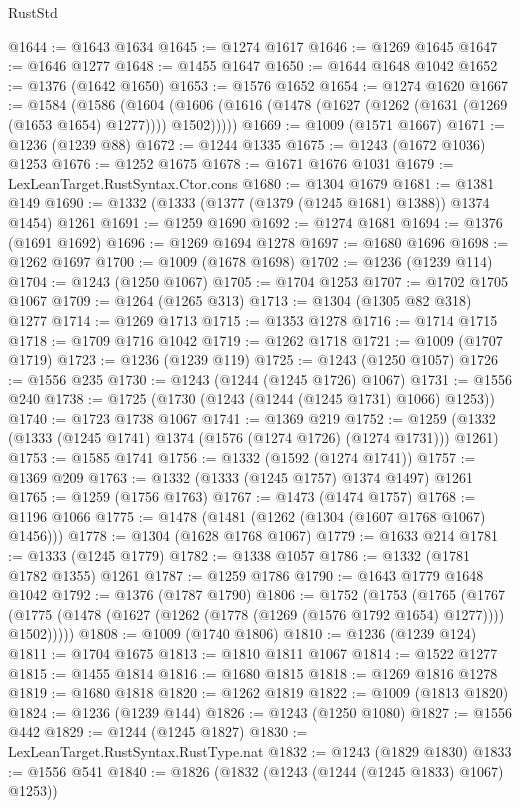 \begin{lexlean}{RustStd}
\begin{coremodule}
{\begin{coremodule}
{{{{{{{{{{{{{{{{{{{{{{{{{{{{{{{{{{{@1644 := @1643 @1634
@1645 := @1274 @1617
@1646 := @1269 @1645
@1647 := @1646 @1277
@1648 := @1455 @1647
@1650 := @1644 @1648 @1042
@1652 := @1376 (@1642 @1650)
@1653 := @1576 @1652
@1654 := @1274 @1620
@1667 := @1584
    (@1586
      (@1604 (@1606 (@1616 (@1478 (@1627 (@1262 (@1631 (@1269 (@1653 @1654) @1277)))) @1502)))))
@1669 := @1009 (@1571 @1667)
@1671 := @1236 (@1239 @88)
@1672 := @1244 @1335
@1675 := @1243 (@1672 @1036) @1253
@1676 := @1252 @1675
@1678 := @1671 @1676 @1031
@1679 := LexLeanTarget.RustSyntax.Ctor.cons
@1680 := @1304 @1679
@1681 := @1381 @149
@1690 := @1332 (@1333 (@1377 (@1379 (@1245 @1681) @1388)) @1374 @1454) @1261
@1691 := @1259 @1690
@1692 := @1274 @1681
@1694 := @1376 (@1691 @1692)
@1696 := @1269 @1694 @1278
@1697 := @1680 @1696
@1698 := @1262 @1697
@1700 := @1009 (@1678 @1698)
@1702 := @1236 (@1239 @114)
@1704 := @1243 (@1250 @1067)
@1705 := @1704 @1253
@1707 := @1702 @1705 @1067
@1709 := @1264 (@1265 @313)
@1713 := @1304 (@1305 @82 @318) @1277
@1714 := @1269 @1713
@1715 := @1353 @1278
@1716 := @1714 @1715
@1718 := @1709 @1716 @1042
@1719 := @1262 @1718
@1721 := @1009 (@1707 @1719)
@1723 := @1236 (@1239 @119)
@1725 := @1243 (@1250 @1057)
@1726 := @1556 @235
@1730 := @1243 (@1244 (@1245 @1726) @1067)
@1731 := @1556 @240
@1738 := @1725 (@1730 (@1243 (@1244 (@1245 @1731) @1066) @1253))
@1740 := @1723 @1738 @1067
@1741 := @1369 @219
@1752 := @1259 (@1332 (@1333 (@1245 @1741) @1374 (@1576 (@1274 @1726) (@1274 @1731))) @1261)
@1753 := @1585 @1741
@1756 := @1332 (@1592 (@1274 @1741))
@1757 := @1369 @209
@1763 := @1332 (@1333 (@1245 @1757) @1374 @1497) @1261
@1765 := @1259 (@1756 @1763)
@1767 := @1473 (@1474 @1757)
@1768 := @1196 @1066
@1775 := @1478 (@1481 (@1262 (@1304 (@1607 @1768 @1067) @1456)))
@1778 := @1304 (@1628 @1768 @1067)
@1779 := @1633 @214
@1781 := @1333 (@1245 @1779)
@1782 := @1338 @1057
@1786 := @1332 (@1781 @1782 @1355) @1261
@1787 := @1259 @1786
@1790 := @1643 @1779 @1648 @1042
@1792 := @1376 (@1787 @1790)
@1806 := @1752
    (@1753
      (@1765
        (@1767 (@1775 (@1478 (@1627 (@1262 (@1778 (@1269 (@1576 @1792 @1654) @1277)))) @1502)))))
@1808 := @1009 (@1740 @1806)
@1810 := @1236 (@1239 @124)
@1811 := @1704 @1675
@1813 := @1810 @1811 @1067
@1814 := @1522 @1277
@1815 := @1455 @1814
@1816 := @1680 @1815
@1818 := @1269 @1816 @1278
@1819 := @1680 @1818
@1820 := @1262 @1819
@1822 := @1009 (@1813 @1820)
@1824 := @1236 (@1239 @144)
@1826 := @1243 (@1250 @1080)
@1827 := @1556 @442
@1829 := @1244 (@1245 @1827)
@1830 := LexLeanTarget.RustSyntax.RustType.nat
@1832 := @1243 (@1829 @1830)
@1833 := @1556 @541
@1840 := @1826 (@1832 (@1243 (@1244 (@1245 @1833) @1067) @1253))
}}}}}}}}}}}}}}}}}}}}}}}}}}}}}}}}}}}
\end{coremodule}}
\end{coremodule}
\end{lexlean}

